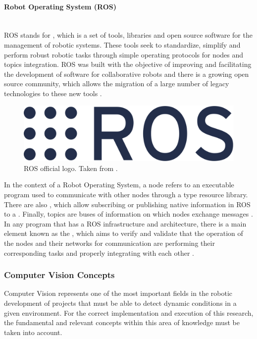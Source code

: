 \documentclass[11pt]{report} %
\newcommand{\subsubsubsection}[1]{\paragraph{#1}\mbox{}\\}
\begin{document}
\subsubsubsection{Robot Operating System (ROS)}

ROS stands for , which is a set of tools, libraries and open source software for the management of robotic systems. These tools seek to standardize, simplify and perform robust robotic tasks through simple operating protocols for nodes and topics integration. ROS was built with the objective of improving and facilitating the development of software for collaborative robots and there is a growing open source community, which allows the migration of a large number of legacy technologies to these new tools \citep{cite_ROS_official_site}.\\

\begin{figure}[H]
    \centering
    \includegraphics[width=0.4\linewidth]{assets/imgs/reference_framework/ros_main_logo.png}
    \caption{ROS official logo. Taken from \citep{cite_ROS_official_site}.} 
    \label{fig_ros_main_logo}
\end{figure}

In the context of a Robot Operating System, a node refers to an executable program used to communicate with other nodes through a  type resource library. There are also , which allow subscribing or publishing native information in ROS to a . Finally, topics are buses of information on which nodes exchange messages \citep{cite_ROS_understanding_nodes}.\\

In any program that has a ROS infrastructure and architecture, there is a main element known as the , which aims to verify and validate that the operation of the nodes and their networks for communication are performing their corresponding tasks and properly integrating with each other \citep{cite_ROS_understanding_nodes}.\\


\subsubsection{Computer Vision Concepts}

Computer Vision represents one of the most important fields in the robotic development of projects that must be able to detect dynamic conditions in a given environment. For the correct implementation and execution of this research, the fundamental and relevant concepts within this area of knowledge must be taken into account.\\
\end{document}
